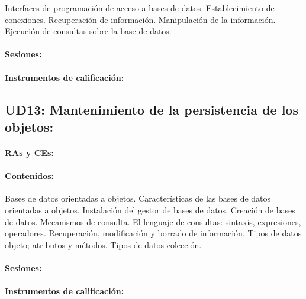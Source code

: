 		Interfaces de programación de acceso a bases de datos.
		Establecimiento de conexiones.
		Recuperación de información.
		Manipulación de la información.
		Ejecución de consultas sobre la base de datos.

	\paragraph{Sesiones:}
	\paragraph{Instrumentos de calificación:}



\newpage
\subsection{UD13: Mantenimiento de la persistencia de los objetos:}

	\paragraph{RAs y CEs:}
	\paragraph{Contenidos:}
		Bases de datos orientadas a objetos.
		Características de las bases de datos orientadas a objetos.
		Instalación del gestor de bases de datos.
		Creación de bases de datos.
		Mecanismos de consulta.
		El lenguaje de consultas: sintaxis, expresiones, operadores.
		Recuperación, modificación y borrado de información.
		Tipos de datos objeto; atributos y métodos.
		Tipos de datos colección.
	\paragraph{Sesiones:}
	\paragraph{Instrumentos de calificación:}

